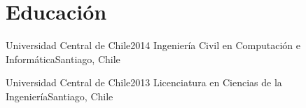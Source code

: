 \section{Educación}
    \resumeSubHeadingListStart

    \resumeSubheading
    {Universidad Central de Chile}{2014}
    {Ingeniería Civil en Computación e Informática}{Santiago, Chile}

    \resumeSubheading
    {Universidad Central de Chile}{2013}
    {Licenciatura en Ciencias de la Ingeniería}{Santiago, Chile}

    \resumeSubHeadingListEnd
